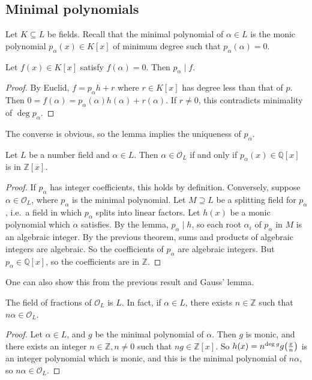\subsection{Minimal polynomials}
Let \( K \subseteq L \) be fields.
Recall that the minimal polynomial of \( \alpha \in L \) is the monic polynomial \( p_\alpha(x) \in K[x] \) of minimum degree such that \( p_\alpha(\alpha) = 0 \).
\begin{lemma}
    Let \( f(x) \in K[x] \) satisfy \( f(\alpha) = 0 \).
    Then \( p_\alpha \mid f \).
\end{lemma}
\begin{proof}
    By Euclid, \( f = p_\alpha h + r \) where \( r \in K[x] \) has degree less than that of \( p \).
    Then \( 0 = f(\alpha) = p_\alpha(\alpha) h(\alpha) + r(\alpha) \).
    If \( r \neq 0 \), this contradicts minimality of \( \deg p_\alpha \).
\end{proof}
The converse is obvious, so the lemma implies the uniqueness of \( p_\alpha \).
\begin{proposition}
    Let \( L \) be a number field and \( \alpha \in L \).
    Then \( \alpha \in \mathcal O_L \) if and only if \( p_\alpha(x) \in \mathbb Q[x] \) is in \( \mathbb Z[x] \).
\end{proposition}
\begin{proof}
    If \( p_\alpha \) has integer coefficients, this holds by definition.
    Conversely, suppose \( \alpha \in \mathcal O_L \), where \( p_\alpha \) is the minimal polynomial.
    Let \( M \supseteq L \) be a splitting field for \( p_\alpha \), i.e.\, a field in which \( p_\alpha \) splits into linear factors.
    Let \( h(x) \) be a monic polynomial which \( \alpha \) satisfies.
    By the lemma, \( p_\alpha \mid h \), so each root \( \alpha_i \) of \( p_\alpha \) in \( M \) is an algebraic integer.
    By the previous theorem, sums and products of algebraic integers are algebraic.
    So the coefficients of \( p_\alpha \) are algebraic integers.
    But \( p_\alpha \in \mathbb Q[x] \), so the coefficients are in \( \mathbb Z \).
\end{proof}
\begin{remark}
    One can also show this from the previous result and Gauss' lemma.
\end{remark}
\begin{lemma}
    The field of fractions of \( \mathcal O_L \) is \( L \).
    In fact, if \( \alpha \in L \), there exists \( n \in \mathbb Z \) such that \( n\alpha \in \mathcal O_L \).
\end{lemma}
\begin{proof}
    Let \( \alpha \in L \), and \( g \) be the minimal polynomial of \( \alpha \).
    Then \( g \) is monic, and there exists an integer \( n \in \mathbb Z, n \neq 0 \) such that \( ng \in \mathbb Z[x] \).
    So \( h(x) = n^{\deg g} g\qty(\frac{x}{n}) \) is an integer polynomial which is monic, and this is the minimal polynomial of \( n\alpha \), so \( n\alpha \in \mathcal O_L \).
\end{proof}

